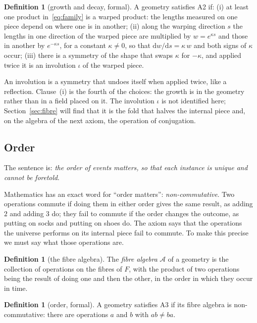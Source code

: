 \documentclass[11pt,a4paper]{article}
\theoremstyle{plain}
\theoremstyle{definition}
\newtheorem{definition}[theorem]{Definition}
\theoremstyle{remark}
\begin{document}
\begin{definition}[growth and decay, formal]\label{def:A2}
A geometry satisfies A2 if: (i) at least one product in~\eqref{eq:family} is a warped product: the lengths measured on one piece depend on where one is in another; (ii) along the warping direction $s$ the lengths in one direction of the warped piece are multiplied by $w=e^{\kappa s}$ and those in another by $e^{-\kappa s}$, for a constant $\kappa\neq0$, so that $\mathrm{d}w/\mathrm{d}s=\kappa\,w$ and both signs of $\kappa$ occur; (iii) there is a symmetry of the shape that swaps $\kappa$ for $-\kappa$, and applied twice it is an involution $\iota$ of the warped piece.
\end{definition}

An involution is a symmetry that undoes itself when applied twice, like a reflection. Clause~(i) is the fourth of the choices: the growth is in the geometry rather than in a field placed on it. The involution $\iota$ is not identified here; Section~\ref{sec:fibre} will find that it is the fold that halves the internal piece and, on the algebra of the next axiom, the operation of conjugation.

\subsection{Order}\label{sec:A3}

The sentence is: \emph{the order of events matters, so that each instance is unique and cannot be foretold}.

Mathematics has an exact word for ``order matters'': \emph{non-commutative}. Two operations commute if doing them in either order gives the same result, as adding $2$ and adding $3$ do; they fail to commute if the order changes the outcome, as putting on socks and putting on shoes do. The axiom says that the operations the universe performs on its internal piece fail to commute. To make this precise we must say what those operations are.

\begin{definition}[the fibre algebra]\label{def:fibrealg}
The \emph{fibre algebra} $\mathcal{A}$ of a geometry is the collection of operations on the fibres of $F$, with the product of two operations being the result of doing one and then the other, in the order in which they occur in time.
\end{definition}

\begin{definition}[order, formal]\label{def:A3}
A geometry satisfies A3 if its fibre algebra is non-commutative: there are operations $a$ and $b$ with $ab\neq ba$.
\end{definition}
\end{document}
